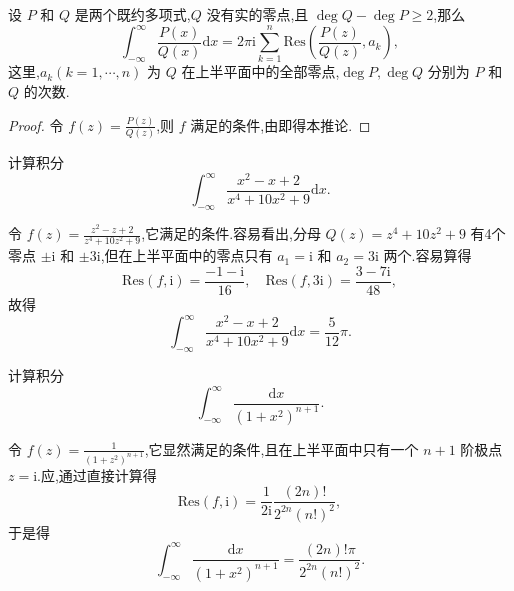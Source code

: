 \documentclass[../../main.tex]{subfiles}%
\begin{document}
\begin{corollary}\label{corollary:推论5.5.2}
设 \( P \) 和 \( Q \) 是两个既约多项式,\( Q \) 没有实的零点,且 \( \deg Q - \deg P \geqslant 2 \),那么
\[
\int_{-\infty}^{\infty} \frac{P(x)}{Q(x)} \mathrm{d}x = 2\pi \mathrm{i} \sum_{k = 1}^{n} \mathrm{Res}\left( \frac{P(z)}{Q(z)}, a_k \right),
\]
这里,\( a_k (k = 1, \cdots, n) \) 为 \( Q \) 在上半平面中的全部零点,\( \deg P, \deg Q \) 分别为 \( P \) 和 \( Q \) 的次数.
\end{corollary}
\begin{proof}

令 \( f(z) = \frac{P(z)}{Q(z)} \),则 \( f \) 满足的条件,由即得本推论.

\end{proof}

\begin{example}
计算积分
\[
\int_{-\infty}^{\infty} \frac{x^2 - x + 2}{x^4 + 10x^2 + 9} \mathrm{d}x.
\]
\end{example}
\begin{solution}

令 \( f(z) = \frac{z^2 - z + 2}{z^4 + 10z^2 + 9} \),它满足的条件.容易看出,分母 \( Q(z) = z^4 + 10z^2 + 9 \) 有4个零点 \( \pm \mathrm{i} \) 和 \( \pm 3\mathrm{i} \),但在上半平面中的零点只有 \( a_1 = \mathrm{i} \) 和 \( a_2 = 3\mathrm{i} \) 两个.容易算得
\[
\mathrm{Res}(f, \mathrm{i}) = \frac{-1 - \mathrm{i}}{16},
\quad
\mathrm{Res}(f, 3\mathrm{i}) = \frac{3 - 7\mathrm{i}}{48},
\]
故得
\[
\int_{-\infty}^{\infty} \frac{x^2 - x + 2}{x^4 + 10x^2 + 9} \mathrm{d}x = \frac{5}{12}\pi.
\]

\end{solution}

\begin{example}
计算积分
\[
\int_{-\infty}^{\infty} \frac{\mathrm{d}x}{(1 + x^2)^{n + 1}}.
\]
\end{example}
\begin{solution}

令 \( f(z) = \frac{1}{(1 + z^2)^{n + 1}} \),它显然满足的条件,且在上半平面中只有一个 \( n + 1 \) 阶极点 \( z = \mathrm{i} \).应,通过直接计算得
\[
\mathrm{Res}(f, \mathrm{i}) = \frac{1}{2\mathrm{i}} \frac{(2n)!}{2^{2n} (n!)^2},
\]
于是得
\[
\int_{-\infty}^{\infty} \frac{\mathrm{d}x}{(1 + x^2)^{n + 1}} = \frac{(2n)! \pi}{2^{2n} (n!)^2}.
\]

\end{solution}
\end{document}
